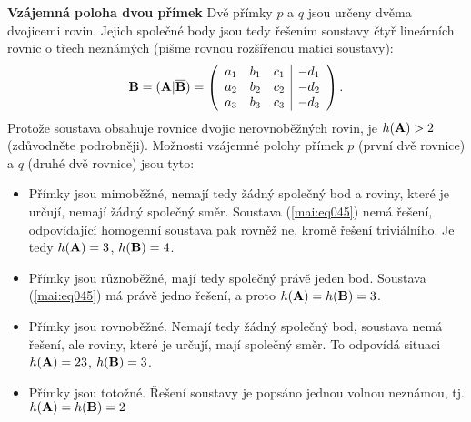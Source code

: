 \wikitextrule
\begin{example}\label{mai:exam044}
  \textbf{Vzájemná poloha dvou přímek}\newline\small
  Dvě přímky \(p\) a \(q\) jsou určeny dvěma dvojicemi rovin. Jejich společné body jsou tedy 
  řešením soustavy čtyř lineárních rovnic o třech neznámých (pišme rovnou rozšířenou matici 
  soustavy):
  \begin{equation}\label{mai:eq045}
    \mathbf{B} = (\mathbf{A}|\overline{\mathbf{B}}) =
    \left(
      \begin{array}{rrr|r}
         a_1 & b_1 & c_1 & -d_1    \\
         a_2 & b_2 & c_2 & -d_2    \\
         a_3 & b_3 & c_3 & -d_3
      \end{array}
    \right).
  \end{equation}
  Protože soustava obsahuje rovnice dvojic nerovnoběžných rovin, je \(h(\mathbf{A}) > 2\) (zdůvodněte 
  podrobněji). Možnosti vzájemné polohy přímek \(p\) (první dvě rovnice) a \(q\) (druhé dvě 
  rovnice) jsou tyto:
  \begin{itemize}
    \item Přímky jsou mimoběžné, nemají tedy žádný společný bod a roviny, které je určují, nemají 
          žádný společný směr. Soustava (\ref{mai:eq045}) nemá řešení, odpovídající homogenní 
          soustava pak rovněž ne, kromě řešení triviálního. Je tedy \(h(\mathbf{A}) = 3\), 
          \(h(\mathbf{B}) = 4\).
    \item Přímky jsou různoběžné, mají tedy společný právě jeden bod. Soustava (\ref{mai:eq045}) má 
          právě jedno řešení, a proto \(h(\mathbf{A}) = h(\mathbf{B}) = 3\).
    \item Přímky jsou rovnoběžné. Nemají tedy žádný společný bod, soustava nemá řešení, ale roviny, 
          které je určují, mají společný směr. To odpovídá situaci \(h(\mathbf{A}) = 23\), 
          \(h(\mathbf{B}) = 3\).
    \item Přímky jsou totožné. Řešení soustavy je popsáno jednou volnou neznámou, tj. \(h(\mathbf{A}) 
          = h(\mathbf{B}) = 2\)
  \end{itemize}
  \normalsize
\end{example}